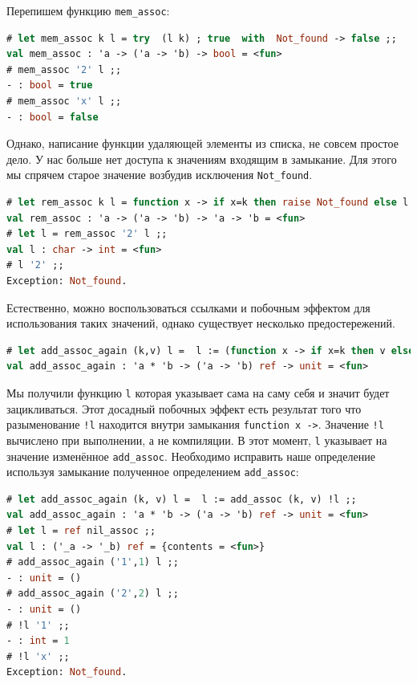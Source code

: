 Перепишем функцию \texttt{mem\_assoc}:

\begin{lstlisting}[language=OCaml]
# let mem_assoc k l = try  (l k) ; true  with  Not_found -> false ;;
val mem_assoc : 'a -> ('a -> 'b) -> bool = <fun>
# mem_assoc '2' l ;;
- : bool = true
# mem_assoc 'x' l ;;
- : bool = false
\end{lstlisting}

Однако, написание функции удаляющей элементы из списка, не совсем простое дело.
У нас больше нет доступа к значениям входящим в замыкание. Для этого мы спрячем
старое значение возбудив исключения \texttt{Not\_found}.

\begin{lstlisting}[language=OCaml]
# let rem_assoc k l = function x -> if x=k then raise Not_found else l x ;;
val rem_assoc : 'a -> ('a -> 'b) -> 'a -> 'b = <fun>
# let l = rem_assoc '2' l ;;
val l : char -> int = <fun>
# l '2' ;;
Exception: Not_found.
\end{lstlisting}

Естественно, можно воспользоваться ссылками и побочным эффектом для
использования таких значений, однако существует несколько предостережений.

\begin{lstlisting}[language=OCaml]
# let add_assoc_again (k,v) l =  l := (function x -> if x=k then v else !l x) ;;
val add_assoc_again : 'a * 'b -> ('a -> 'b) ref -> unit = <fun>
\end{lstlisting}

Мы получили функцию \texttt{l} которая указывает сама на саму себя и значит
будет зацикливаться. Этот досадный побочных эффект есть результат того что
разыменование \texttt{!l} находится внутри замыкания \texttt{function x ->}.
Значение \texttt{!l} вычислено при выполнении, а не компиляции. В этот момент,
\texttt{l} указывает на значение изменённое \texttt{add\_assoc}. Необходимо
исправить наше определение используя замыкание полученное определением
\texttt{add\_assoc}:

\begin{lstlisting}[language=OCaml]
# let add_assoc_again (k, v) l =  l := add_assoc (k, v) !l ;;
val add_assoc_again : 'a * 'b -> ('a -> 'b) ref -> unit = <fun>
# let l = ref nil_assoc ;;
val l : ('_a -> '_b) ref = {contents = <fun>}
# add_assoc_again ('1',1) l ;;
- : unit = ()
# add_assoc_again ('2',2) l ;;
- : unit = ()
# !l '1' ;;
- : int = 1
# !l 'x' ;;
Exception: Not_found.
\end{lstlisting}

